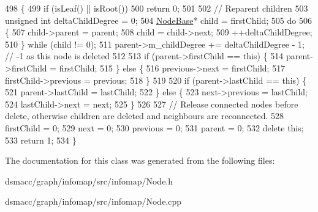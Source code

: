 \begin{DoxyCode}
498 \{
499     \textcolor{keywordflow}{if} (isLeaf() || isRoot())
500         \textcolor{keywordflow}{return} 0;
501 
502     \textcolor{comment}{// Reparent children}
503     \textcolor{keywordtype}{unsigned} \textcolor{keywordtype}{int} deltaChildDegree = 0;
504     \mbox{\hyperlink{classNodeBase}{NodeBase}}* child = firstChild;
505     \textcolor{keywordflow}{do}
506     \{
507         child->parent = parent;
508         child = child->next;
509         ++deltaChildDegree;
510     \} \textcolor{keywordflow}{while} (child != 0);
511     parent->m\_childDegree += deltaChildDegree - 1; \textcolor{comment}{// -1 as this node is deleted}
512 
513     \textcolor{keywordflow}{if} (parent->firstChild == \textcolor{keyword}{this}) \{
514         parent->firstChild = firstChild;
515     \} \textcolor{keywordflow}{else} \{
516         previous->next = firstChild;
517         firstChild->previous = previous;
518     \}
519 
520     \textcolor{keywordflow}{if} (parent->lastChild == \textcolor{keyword}{this}) \{
521         parent->lastChild = lastChild;
522     \} \textcolor{keywordflow}{else} \{
523         next->previous = lastChild;
524         lastChild->next = next;
525     \}
526 
527     \textcolor{comment}{// Release connected nodes before delete, otherwise children are deleted and neighbours are
       reconnected.}
528     firstChild = 0;
529     next = 0;
530     previous = 0;
531     parent = 0;
532     \textcolor{keyword}{delete} \textcolor{keyword}{this};
533     \textcolor{keywordflow}{return} 1;
534 \}
\end{DoxyCode}


The documentation for this class was generated from the following files\+:\begin{DoxyCompactItemize}
\item 
dsmacc/graph/infomap/src/infomap/Node.\+h\item 
dsmacc/graph/infomap/src/infomap/Node.\+cpp\end{DoxyCompactItemize}
